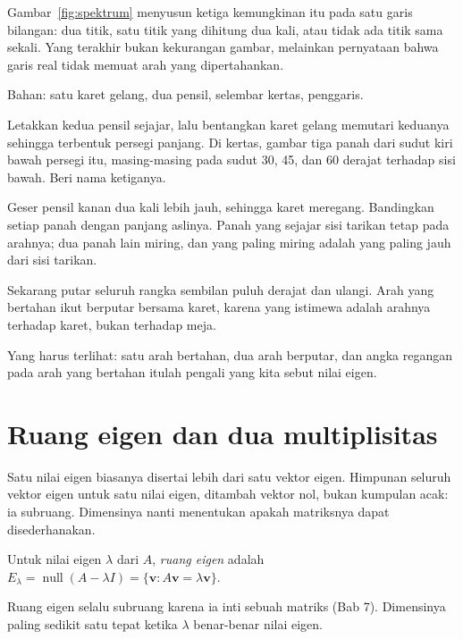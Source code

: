 Gambar~\ref{fig:spektrum} menyusun ketiga kemungkinan itu pada satu garis bilangan: dua titik,
satu titik yang dihitung dua kali, atau tidak ada titik sama sekali. Yang terakhir bukan kekurangan
gambar, melainkan pernyataan bahwa garis real tidak memuat arah yang dipertahankan.

\begin{tangan}
Bahan: satu karet gelang, dua pensil, selembar kertas, penggaris.

Letakkan kedua pensil sejajar, lalu bentangkan karet gelang memutari keduanya sehingga terbentuk
persegi panjang. Di kertas, gambar tiga panah dari sudut kiri bawah persegi itu, masing-masing pada
sudut 30, 45, dan 60 derajat terhadap sisi bawah. Beri nama ketiganya.

Geser pensil kanan dua kali lebih jauh, sehingga karet meregang. Bandingkan setiap panah dengan
panjang aslinya. Panah yang sejajar sisi tarikan tetap pada arahnya; dua panah lain miring, dan
yang paling miring adalah yang paling jauh dari sisi tarikan.

Sekarang putar seluruh rangka sembilan puluh derajat dan ulangi. Arah yang bertahan ikut berputar
bersama karet, karena yang istimewa adalah arahnya terhadap karet, bukan terhadap meja.

Yang harus terlihat: satu arah bertahan, dua arah berputar, dan angka regangan pada arah yang
bertahan itulah pengali yang kita sebut nilai eigen.
\end{tangan}

\section{Ruang eigen dan dua multiplisitas}

Satu nilai eigen biasanya disertai lebih dari satu vektor eigen. Himpunan seluruh vektor eigen
untuk satu nilai eigen, ditambah vektor nol, bukan kumpulan acak: ia subruang. Dimensinya nanti
menentukan apakah matriksnya dapat disederhanakan.

\begin{definisi}
Untuk nilai eigen $\lambda$ dari $A$, \emph{ruang eigen} adalah
$E_{\lambda}=\operatorname{null}(A-\lambda I)=\{\mathbf{v}:A\mathbf{v}=\lambda\mathbf{v}\}$.
\end{definisi}


Ruang eigen selalu subruang karena ia inti sebuah matriks (Bab 7). Dimensinya paling sedikit satu
tepat ketika $\lambda$ benar-benar nilai eigen.

